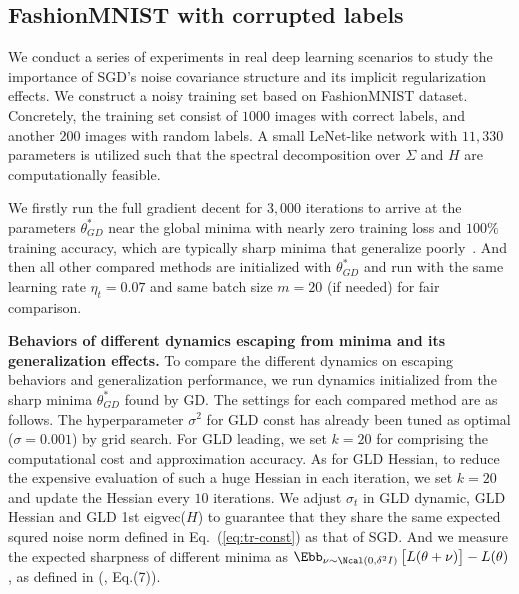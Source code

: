 \documentclass{article}
\begin{document}
\subsection{FashionMNIST with corrupted labels}
We conduct a series of experiments in real deep learning scenarios to study the importance of SGD's noise covariance structure and its implicit regularization effects. 
We construct a noisy training set based on FashionMNIST dataset.
Concretely, the training set consist of $1000$ images with correct labels, and another $200$ images with random labels. %
A small LeNet-like network with $11,330$ parameters is utilized such that the spectral decomposition over  $\Sigma$ and $H$ are computationally feasible.

We firstly run the full gradient decent for $3,000$ iterations to arrive at the parameters $\theta^*_{GD}$ near the global minima with nearly zero training loss and $100\%$ training accuracy, which are typically sharp minima that generalize poorly~\citep{neyshabur2017}.
And then all other compared methods are initialized with $\theta^*_{GD}$ and run with the same learning rate $\eta_t = 0.07$ and same batch size $m=20$ (if needed) for fair comparison.

\textbf{Behaviors of different dynamics escaping from minima and its generalization effects.}
To compare the different dynamics on escaping behaviors and  generalization performance, we run dynamics initialized from the sharp minima $\theta^*_{GD}$ found by GD.
The settings for each compared method are as follows. The hyperparameter $\sigma^2$ for GLD const has already been tuned as optimal ($\sigma=0.001$) by grid search. For GLD leading, we set $k=20$ for comprising the computational cost and approximation accuracy. As for GLD Hessian, to reduce the expensive evaluation of such a huge Hessian in each iteration, we set $k=20$ and update the Hessian every $10$ iterations. We adjust $\sigma_t$ in GLD dynamic, GLD Hessian and GLD 1st eigvec($H$) to guarantee that they share the same expected squred noise norm defined in Eq.~(\ref{eq:tr-const}) as that of SGD.
And we measure the expected sharpness of different minima as $\Ebb_{\nu \sim \Ncal(0, \delta^2 I)} \left[ L(\theta + \nu)\right] - L(\theta)$, as defined in (\citep{neyshabur2017}, Eq.(7)). %
\end{document}
